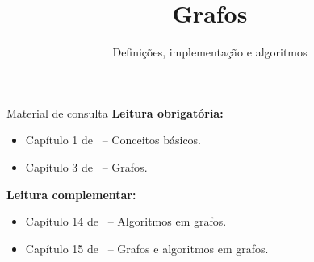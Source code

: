 \newcommand{\defs}{../defs}


\title[Grafos]{Grafos}
\subtitle{Definições, implementação e algoritmos}

\immediate{}
\immediate{}
\immediate{}
\immediate{}



\maketitle

\begin{frame}{Material de consulta}
	\textbf{Leitura obrigatória:}
	\begin{itemize}
		\item Capítulo 1 de~\cite{Goldbarg2AndGoldbarg2012} -- Conceitos básicos.
		\item Capítulo 3 de~\cite{KleinbergAndTardos2006} -- Grafos.
	\end{itemize}
	
	\bigskip
	
	\textbf{Leitura complementar:}
	\begin{itemize}
		\item Capítulo 14 de~\cite{GoodrichEtAl2014} -- Algoritmos em grafos.
		\item Capítulo 15 de~\cite{Preiss2001} -- Grafos e algoritmos em grafos.
	\end{itemize}
\end{frame}



